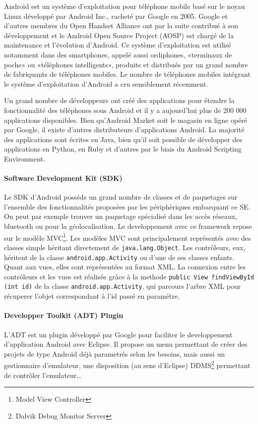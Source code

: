 \documentclass[a4paper,11pt,french]{article}
\def\android{Android\texttrademark{}}
\begin{document}
\android{} est un système d'exploitation pour téléphone mobile basé sur le noyau Linux développé par \android{} Inc., racheté par Google en 2005. Google et d'autres membres du Open Handset Alliance ont par la suite contribué à son développement et le \android{} Open Source Project (AOSP) est chargé de la maintenance et l'évolution d'\android{}. Ce système d'exploitation est utilisé notamment dans des smartphones, appelé aussi ordiphones, «terminaux de poche» ou «téléphones intelligents», produits et distribués par un grand nombre de fabriquants de téléphones mobiles. Le nombre de téléphones mobiles intégrant le système d'exploitation d'\android{} a cru sensiblement récemment.

Un grand nombre de développeurs ont créé des applications pour étendre la fonctionnalité des téléphones sous \android{} et il y a aujourd'hui
plus de 200 000 applications disponibles. Bien qu'\android{} Market soit le magasin en ligne opéré par Google, il existe d'autres distributeurs
d'applications \android{}. La majorité des applications sont écrites en Java, bien qu'il soit possible de développer des applications en
Python, en Ruby et d'autres par le biais du \android{} Scripting Environment.

\paragraph{Software Development Kit (SDK)}
Le SDK d'\android{} posséde un grand nombre de classes et de paquetages sur l'ensemble des fonctionnalités proposées par les périphèriques embarquant ce SE. On peut par exemple trouver un paquetage spécialisé dans les accès réseaux, bluetooth ou pour la géolocalisation. Le developpement avec ce framework repose sur le modèle MVC\footnote{Model View Controller}. Les modèles MVC sont principalement représentés avec des classes simple héritant directement de \verb!java.lang.Object!. Les contrôleurs, eux, héritent de la classe \verb!android.app.Activity! ou d'une de ses classes enfants. Quant aux vues, elles sont représentées au format XML.
La connexion entre les contrôleurs et les vues est réalisée grâce à la methode \verb!public View findViewById (int id)! de la classe \verb!android.app.Activity!, qui parcours l'arbre XML pour récuperer l'objet correspondant à l'id passé en paramétre.

\paragraph{Developper Toolkit (ADT) Plugin}
L'ADT est un plugin développé par Google pour faciliter le developpement d'application \android{} avec Eclipse. Il propose un menu permettant de créer des projets de type \android{} déjà parametrés selon les besoins, mais aussi un gestionnaire d'emulateur, une disposition (au sens d'Eclipse) DDMS\footnote{Dalvik Debug Monitor Server} permettant de contrôler l'emulateur\dots{}
\end{document}
